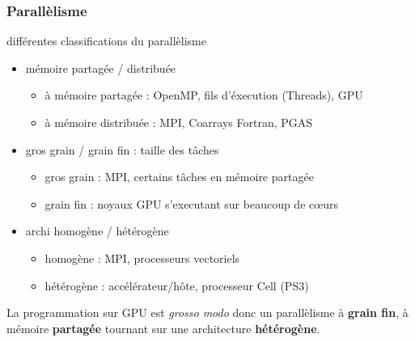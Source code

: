 \documentclass[11pt,mathserif]{beamer}
\newcommand{\gezi}{\faLongArrowRight}
\begin{document}
\begin{frame}
\frametitle{Parallèlisme}
\pause
différentes classifications du parallèlisme
\begin{itemize}[<+->]
  \item mémoire partagée / distribuée
    \begin{itemize}
      \item à mémoire partagée : OpenMP, fils d'éxecution (Threads), GPU 
      \item à mémoire distribuée : MPI, Coarrays Fortran, PGAS
    \end{itemize}
 \item gros grain / grain fin : taille des tâches
   \begin{itemize}
     \item gros grain : MPI, certains tâches en mémoire partagée
     \item grain fin : noyaux GPU s'executant sur beaucoup de cœurs
   \end{itemize}
 \item archi homogène / hétérogène 
   \begin{itemize}
     \item homogène : MPI, processeurs vectoriels
     \item hétérogène : accélérateur/hôte, processeur Cell (PS3)
   \end{itemize}
\end{itemize}
\pause
  \gezi La programmation sur GPU est {\it grosso modo } donc un parallèlisme à {\bf grain fin}, à mémoire {\bf partagée} tournant sur
  une architecture {\bf hétérogène}.
\end{frame}
\end{document}
